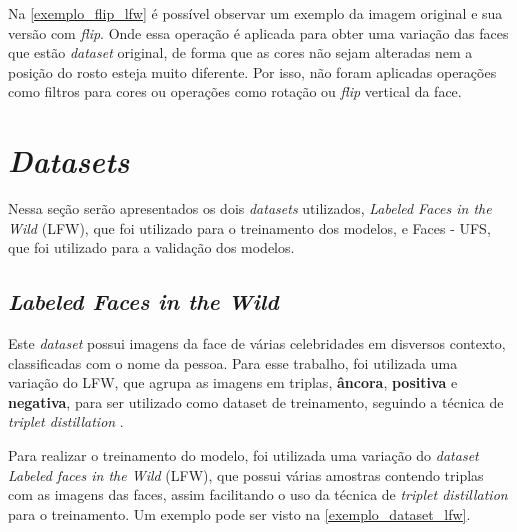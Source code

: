 Na \autoref{exemplo_flip_lfw} é possível observar um exemplo da imagem original e sua versão com \textit{flip}.
Onde essa operação é aplicada para obter uma variação das faces que estão \textit{dataset} original, de forma que as
cores não sejam alteradas nem a posição do rosto esteja muito diferente.
Por isso, não foram aplicadas operações como filtros para cores ou operações como rotação ou \textit{flip} vertical da
face.

\section{\textit{Datasets}}\label{sec_datasets}
Nessa seção serão apresentados os dois \textit{datasets} utilizados, \textit{Labeled Faces in the Wild} (LFW),
que foi utilizado para o treinamento dos modelos, e Faces - UFS, que foi utilizado para a validação dos modelos.

\subsection{\textit{Labeled Faces in the Wild}}
Este \textit{dataset} possui imagens da face de várias celebridades em disversos contexto, classificadas com o nome da
pessoa.
Para esse trabalho, foi utilizada uma variação do LFW, que agrupa as imagens em triplas, \textbf{âncora},
\textbf{positiva} e \textbf{negativa}, para ser utilizado como dataset de treinamento, seguindo a técnica
de \textit{triplet distillation} \cite{triplet_distillation_face_recognition}.

Para realizar o treinamento do modelo, foi utilizada uma variação do \textit{dataset}
\textit{Labeled faces in the Wild} (LFW), que possui várias amostras contendo triplas com as imagens das faces,
assim facilitando o uso da técnica de \textit{triplet distillation} para o treinamento. Um exemplo pode ser visto
na \autoref{exemplo_dataset_lfw}.

